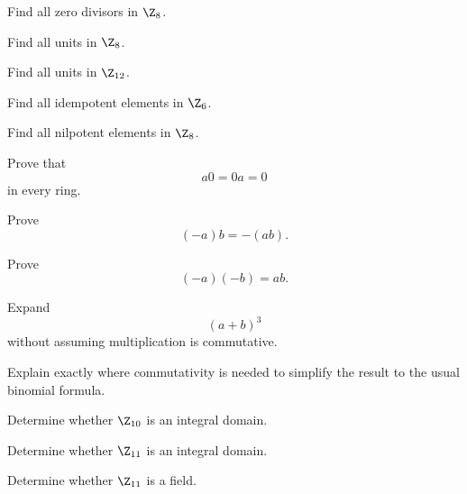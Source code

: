 \begin{exercise}[1]
Find all zero divisors in \(\Z_8\).
\end{exercise}

\begin{exercise}[1]
Find all units in \(\Z_8\).
\end{exercise}

\begin{exercise}[2]
Find all units in \(\Z_{12}\).
\end{exercise}

\begin{exercise}[2]
Find all idempotent elements in \(\Z_6\).
\end{exercise}

\begin{exercise}[2]
Find all nilpotent elements in \(\Z_8\).
\end{exercise}

\begin{exercise}[2]
Prove that
\[ a0=0a=0 \]
in every ring.
\end{exercise}

\begin{exercise}[2]
Prove
\[ (-a)b=-(ab). \]
\end{exercise}

\begin{exercise}[2]
Prove
\[ (-a)(-b)=ab. \]
\end{exercise}

\begin{exercise}[2]
Expand
\[ (a+b)^3 \]
without assuming multiplication is commutative.
\end{exercise}

\begin{exercise}[2]
Explain exactly where commutativity is needed to simplify the result to the
usual binomial formula.
\end{exercise}

\begin{exercise}[1]
Determine whether \(\Z_{10}\) is an integral domain.
\end{exercise}

\begin{exercise}[1]
Determine whether \(\Z_{11}\) is an integral domain.
\end{exercise}

\begin{exercise}[1]
Determine whether \(\Z_{11}\) is a field.
\end{exercise}

